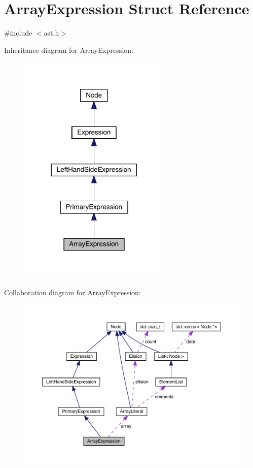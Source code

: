 \hypertarget{struct_array_expression}{}\section{Array\+Expression Struct Reference}
\label{struct_array_expression}


{\ttfamily \#include $<$ast.\+h$>$}



Inheritance diagram for Array\+Expression\+:\nopagebreak
\begin{figure}[H]
\begin{center}
\leavevmode
\includegraphics[width=206pt]{struct_array_expression__inherit__graph}
\end{center}
\end{figure}


Collaboration diagram for Array\+Expression\+:\nopagebreak
\begin{figure}[H]
\begin{center}
\leavevmode
\includegraphics[width=350pt]{struct_array_expression__coll__graph}
\end{center}
\end{figure}
